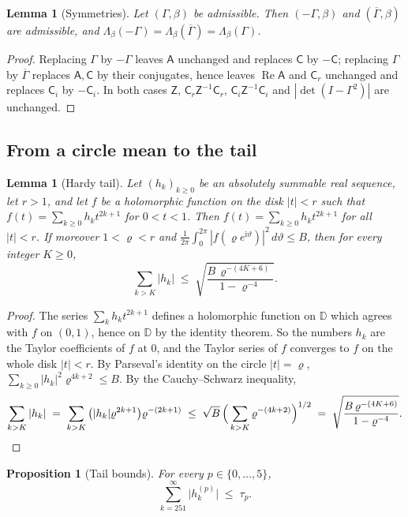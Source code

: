 \documentclass[11pt,reqno]{amsart}
\newtheorem{proposition}[theorem]{Proposition}
\newtheorem{lemma}[theorem]{Lemma}
\theoremstyle{definition}
\numberwithin{equation}{section}
\newcommand{\D}{\mathbb{D}}
\newcommand{\ii}{\mathrm{i}}
\newcommand{\sA}{\mathsf{A}}
\newcommand{\sC}{\mathsf{C}}
\newcommand{\sZ}{\mathsf{Z}}
\DeclareMathOperator{\RePart}{Re}
\begin{document}
\begin{lemma}[Symmetries]\label{lem:symm}
Let $(\Gamma,\beta)$ be admissible. Then $(-\Gamma,\beta)$ and $(\overline{\Gamma},\beta)$ are admissible, and $\Lambda_\beta(-\Gamma)=\Lambda_\beta(\overline\Gamma)=\Lambda_\beta(\Gamma)$.
\end{lemma}

\begin{proof}
Replacing $\Gamma$ by $-\Gamma$ leaves $\sA$ unchanged and replaces $\sC$ by $-\sC$; replacing $\Gamma$ by $\overline\Gamma$ replaces $\sA,\sC$ by their conjugates, hence leaves $\RePart\sA$ and $\sC_r$ unchanged and replaces $\sC_i$ by $-\sC_i$. In both cases $\sZ$, $\sC_r\sZ^{-1}\sC_r$, $\sC_i\sZ^{-1}\sC_i$ and $|\det(I-\Gamma^2)|$ are unchanged.
\end{proof}

\subsection{From a circle mean to the tail}

\begin{lemma}[Hardy tail]\label{lem:hardy}
Let $(h_k)_{k\ge0}$ be an absolutely summable real sequence, let $r>1$, and let $f$ be a holomorphic function on the disk $|t|<r$ such that $f(t)=\sum_{k\ge0}h_k t^{2k+1}$ for $0<t<1$. Then $f(t)=\sum_{k\ge0}h_kt^{2k+1}$ for all $|t|<r$. If moreover $1<\varrho<r$ and $\frac{1}{2\pi}\int_0^{2\pi}|f(\varrho e^{\ii\vartheta})|^2\,d\vartheta\le B$, then for every integer $K\ge0$,
\[
  \sum_{k>K}|h_k| \;\le\; \sqrt{\frac{B\,\varrho^{-(4K+6)}}{1-\varrho^{-4}}}.
\]
\end{lemma}

\begin{proof}
The series $\sum_kh_kt^{2k+1}$ defines a holomorphic function on $\D$ which agrees with $f$ on $(0,1)$, hence on $\D$ by the identity theorem. So the numbers $h_k$ are the Taylor coefficients of $f$ at $0$, and the Taylor series of $f$ converges to $f$ on the whole disk $|t|<r$. By Parseval's identity on the circle $|t|=\varrho$, $\sum_{k\ge0}|h_k|^2\varrho^{4k+2}\le B$. By the Cauchy--Schwarz inequality,
\[
  \sum_{k>K}|h_k| \;=\; \sum_{k>K}\big(|h_k|\varrho^{2k+1}\big)\varrho^{-(2k+1)}
  \;\le\; \sqrt{B}\,\Big(\sum_{k>K}\varrho^{-(4k+2)}\Big)^{1/2}
  \;=\; \sqrt{\frac{B\,\varrho^{-(4K+6)}}{1-\varrho^{-4}}}. \qedhere
\]
\end{proof}

\begin{proposition}[Tail bounds]\label{prop:tails}
For every $p\in\{0,\dots,5\}$,
\[
  \sum_{k=251}^\infty\bigl|h^{(p)}_k\bigr|\;\le\;\tau_p .
\]
\end{proposition}
\end{document}
